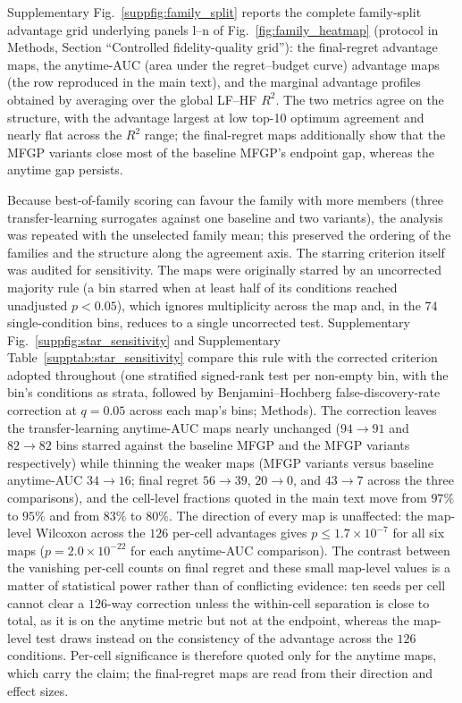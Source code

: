 \documentclass[11pt,a4paper]{article}%
\begin{document}

Supplementary Fig.~\ref{suppfig:family_split} reports the complete family-split
advantage grid underlying panels l--n of Fig.~\ref{fig:family_heatmap}
(protocol in Methods, Section ``Controlled fidelity-quality grid''): the
final-regret advantage maps, the anytime-AUC (area under the regret--budget curve) advantage maps (the row reproduced in
the main text), and the marginal advantage profiles obtained by averaging over the
global LF--HF $R^2$. The two metrics agree on the structure, with the advantage
largest at low top-10 optimum agreement and nearly flat across the $R^2$ range; the
final-regret maps additionally show that the MFGP variants close most of the baseline
MFGP's endpoint gap, whereas the anytime gap persists.

Because best-of-family scoring can favour the family with more members (three
transfer-learning surrogates against one baseline and two variants), the analysis was
repeated with the unselected family mean; this preserved the ordering of the families
and the structure along the agreement axis.
The starring criterion itself was audited for sensitivity. The maps were originally
starred by an uncorrected majority rule (a bin starred when at least half of its
conditions reached unadjusted $p<0.05$), which ignores multiplicity across the map
and, in the $74$ single-condition bins, reduces to a single uncorrected test.
Supplementary Fig.~\ref{suppfig:star_sensitivity} and Supplementary
Table~\ref{supptab:star_sensitivity} compare this rule with the corrected criterion
adopted throughout (one stratified signed-rank test per non-empty bin, with the
bin's conditions as strata, followed by Benjamini--Hochberg false-discovery-rate
correction at $q = 0.05$ across each map's bins; Methods). The correction leaves the
transfer-learning anytime-AUC maps nearly unchanged ($94 \to 91$ and $82 \to 82$
bins starred against the baseline MFGP and the MFGP variants respectively) while
thinning the weaker maps (MFGP variants versus baseline anytime-AUC $34 \to 16$;
final regret $56 \to 39$, $20 \to 0$, and $43 \to 7$ across the three comparisons),
and the cell-level fractions quoted in the main text move from $97\%$ to $95\%$ and
from $83\%$ to $80\%$. The direction of every map is unaffected: the map-level
Wilcoxon across the $126$ per-cell advantages gives $p \le 1.7\times10^{-7}$ for all
six maps ($p = 2.0\times10^{-22}$ for each anytime-AUC comparison). The contrast
between the vanishing per-cell counts on final regret and these small map-level values
is a matter of statistical power rather than of conflicting evidence: ten seeds per
cell cannot clear a $126$-way correction unless the within-cell separation is close to
total, as it is on the anytime metric but not at the endpoint, whereas the map-level
test draws instead on the consistency of the advantage across the $126$ conditions.
Per-cell significance is therefore quoted only for the anytime maps, which carry the
claim; the final-regret maps are read from their direction and effect sizes.
\end{document}
